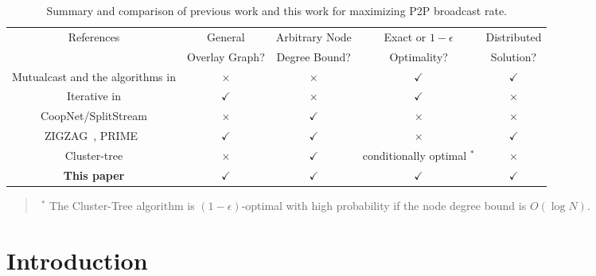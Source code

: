 \documentclass[10pt,conference]{IEEEtran}
\begin{document}
\begin{table*}
\caption{Summary and comparison of previous work and this work for maximizing
P2P broadcast rate.}


\label{tab:summary} \begin{small}

\begin{centering}
\begin{tabular}{|c|c|c|c|c|}
\hline
References\emph{ }  & General\emph{ }  & Arbitrary Node\emph{ }  & Exact or\emph{ }$1-\epsilon$  & Distributed \tabularnewline
 & Overlay Graph?  & Degree Bound?  & Optimality?  & Solution?\tabularnewline
\hline
\hline
Mutualcast \cite{all:Mutualcast:LPZ05} and the algorithms in \cite{massoulie2007rdb,all:P2PStreaming:KLR.07}  & $\times$  & $\times$  & \textbf{$\mathbf{\checkmark}$}  & \textbf{$\mathbf{\checkmark}$}\tabularnewline
\hline
Iterative in \cite{yicui06_optimal,sudipta2009lcclc}  & \textbf{$\mathbf{\checkmark}$}  & $\times$  & \textbf{$\mathbf{\checkmark}$}  & $\times$\tabularnewline
\hline
CoopNet/SplitStream \cite{castro2003shb,padmanabhan2002ccn}  & $\times$  & \textbf{$\mathbf{\checkmark}$}  & $\times$  & $\times$\tabularnewline
\hline
ZIGZAG~\cite{zigzag}, PRIME~\cite{magharei2009prime}  & \textbf{$\mathbf{\checkmark}$}  & \textbf{$\mathbf{\checkmark}$}  & $\times$  & \textbf{$\mathbf{\checkmark}$}\tabularnewline
\hline
Cluster-tree \cite{streaming_capacity.icdcs10}  & $\times$  & \textbf{$\mathbf{\checkmark}$}  & conditionally optimal $^{*}$  & $\times$\tabularnewline
\hline
\textbf{This paper }  & \textbf{$\mathbf{\checkmark}$}  & \textbf{$\mathbf{\checkmark}$}  & \textbf{$\mathbf{\checkmark}$}  & \textbf{$\mathbf{\checkmark}$}\tabularnewline
\hline
\end{tabular}
\par\end{centering}

\end{small}
\begin{quote}
\begin{scriptsize} $\;{}^{*}$ The Cluster-Tree algorithm is $(1-\epsilon)$-optimal
with high probability if the node degree bound is $O\left(\log N\right)$.
\end{scriptsize}
\end{quote}

\end{table*}



\section{Introduction}
\end{document}
